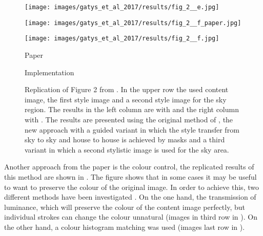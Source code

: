 \begin{figure}[H]
\begin{minipage}[t]{0.45\textwidth}
\end{minipage}
\hfill%
\begin{minipage}[t]{0.45\textwidth}
	\centering
	\texttt{[image: images/gatys\_et\_al\_2017/results/fig\_2\_\_e.jpg]}
\end{minipage}
\hfill%
\begin{minipage}[t]{0.45\textwidth}
	\centering
	\texttt{[image: images/gatys\_et\_al\_2017/results/fig\_2\_\_f\_paper.jpg]}
\end{minipage}
\hfill%
\begin{minipage}[t]{0.45\textwidth}
	\centering
	\texttt{[image: images/gatys\_et\_al\_2017/results/fig\_2\_\_f.jpg]}
\end{minipage}
	\hfill%
\begin{minipage}[t]{0.45\textwidth}
	\centering
	Paper
\end{minipage}
\hfill%
\begin{minipage}[t]{0.45\textwidth}
	\centering
	Implementation
\end{minipage}
\caption{Replication of Figure 2 from \cite{GEB+2017}. In the upper row the used content image, the first style image and a second style image for the sky region. The results in the left column are with  \paper{} and the right column with \implementation{}.  The results are presented using the original method of \cite{GEB2016}, the new approach with a guided variant in which the style transfer from sky to sky and house to house is achieved by masks and a third variant in which a second stylistic image is used for the sky area.}
\label{fig:GEB+2017_fig2}
\end{figure}

Another approach from the paper is the colour control, the replicated results of this method are shown in . The figure shows that in some cases it may be useful to want to preserve the colour of the original image. In order to achieve this, two different methods have been investigated \cite{GEB+2017}. On the one hand, the transmission of luminance, which will preserve the colour of the content image perfectly, but individual strokes can change the colour unnatural \cite{GEB+2017} (images in third row in ). On the other hand, a colour histogram matching was used \cite{GEB+2017}(images last row in ).

